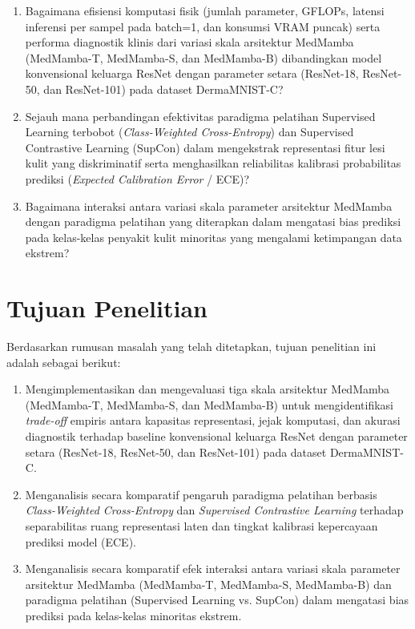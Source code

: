 \begin{enumerate}[noitemsep]
	\item Bagaimana efisiensi komputasi fisik (jumlah parameter, GFLOPs, latensi inferensi per sampel pada batch=1, dan konsumsi VRAM puncak) serta performa diagnostik klinis dari variasi skala arsitektur MedMamba (MedMamba-T, MedMamba-S, dan MedMamba-B) dibandingkan model konvensional keluarga ResNet dengan parameter setara (ResNet-18, ResNet-50, dan ResNet-101) pada dataset DermaMNIST-C?
	\item Sejauh mana perbandingan efektivitas paradigma pelatihan Supervised Learning terbobot (\textit{Class-Weighted Cross-Entropy}) dan Supervised Contrastive Learning (SupCon) dalam mengekstrak representasi fitur lesi kulit yang diskriminatif serta menghasilkan reliabilitas kalibrasi probabilitas prediksi (\textit{Expected Calibration Error} / ECE)?
	\item Bagaimana interaksi antara variasi skala parameter arsitektur MedMamba dengan paradigma pelatihan yang diterapkan dalam mengatasi bias prediksi pada kelas-kelas penyakit kulit minoritas yang mengalami ketimpangan data ekstrem?
\end{enumerate}

\section{Tujuan Penelitian} \label{I.Tujuan}
Berdasarkan rumusan masalah yang telah ditetapkan, tujuan penelitian ini adalah sebagai berikut: \par

\begin{enumerate}[noitemsep]
	\item Mengimplementasikan dan mengevaluasi tiga skala arsitektur MedMamba (MedMamba-T, MedMamba-S, dan MedMamba-B) untuk mengidentifikasi \textit{trade-off} empiris antara kapasitas representasi, jejak komputasi, dan akurasi diagnostik terhadap baseline konvensional keluarga ResNet dengan parameter setara (ResNet-18, ResNet-50, dan ResNet-101) pada dataset DermaMNIST-C.
	\item Menganalisis secara komparatif pengaruh paradigma pelatihan berbasis \textit{Class-Weighted Cross-Entropy} dan \textit{Supervised Contrastive Learning} terhadap separabilitas ruang representasi laten dan tingkat kalibrasi kepercayaan prediksi model (ECE).
	\item Menganalisis secara komparatif efek interaksi antara variasi skala parameter arsitektur MedMamba (MedMamba-T, MedMamba-S, MedMamba-B) dan paradigma pelatihan (Supervised Learning vs. SupCon) dalam mengatasi bias prediksi pada kelas-kelas minoritas ekstrem.
\end{enumerate}

